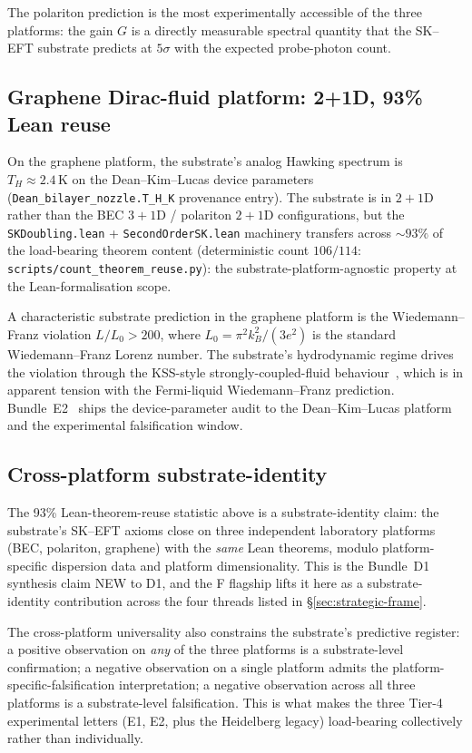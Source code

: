 \documentclass[aps,prd,reprint,nofootinbib,superscriptaddress]{revtex4-2}
\begin{document}
The polariton prediction is the most experimentally accessible of
the three platforms: the gain $G$ is a directly measurable spectral
quantity that the SK--EFT substrate predicts at $5\sigma$ with the
expected probe-photon count.

\subsection{Graphene Dirac-fluid platform: 2+1D, 93\% Lean reuse}

On the graphene platform, the substrate's analog Hawking spectrum is
$T_H \approx 2.4\,\mathrm{K}$ on the Dean--Kim--Lucas device parameters
(\texttt{Dean\_bilayer\_nozzle.T\_H\_K} provenance entry). The substrate is in
$2{+}1$D rather than the BEC $3{+}1$D / polariton $2{+}1$D
configurations, but the \texttt{SKDoubling.lean} +
\texttt{SecondOrderSK.lean} machinery transfers across $\sim 93\%$
of the load-bearing theorem content (deterministic count
$106/114$: \texttt{scripts/count\_theorem\_reuse.py}): the
substrate-platform-agnostic
property at the Lean-formalisation scope.

A characteristic substrate prediction in the graphene platform is the
Wiedemann--Franz violation $L/L_0 > 200$, where $L_0 = \pi^2 k_B^2 /
(3 e^2)$ is the standard Wiedemann--Franz Lorenz number. The
substrate's hydrodynamic regime drives the violation through the
KSS-style strongly-coupled-fluid behaviour~\cite{KSS2005}, which is
in apparent tension with the Fermi-liquid Wiedemann--Franz prediction.
Bundle~E2~\cite{Roehm2026E2} ships the device-parameter audit to the
Dean--Kim--Lucas platform and the experimental falsification window.

\subsection{Cross-platform substrate-identity}

The 93\% Lean-theorem-reuse statistic above is a substrate-identity
claim: the substrate's SK--EFT axioms close on three independent
laboratory platforms (BEC, polariton, graphene) with the \emph{same}
Lean theorems, modulo platform-specific dispersion data and platform
dimensionality. This is the Bundle~D1 synthesis claim NEW to D1, and
the F flagship lifts it here as a substrate-identity contribution
across the four threads listed in \S\ref{sec:strategic-frame}.

The cross-platform universality also constrains the substrate's
predictive register: a positive observation on \emph{any} of the three
platforms is a substrate-level confirmation; a negative observation
on a single platform admits the platform-specific-falsification
interpretation; a negative observation across all three platforms is
a substrate-level falsification. This is what makes the three Tier-4
experimental letters (E1, E2, plus the Heidelberg legacy) load-bearing
collectively rather than individually.
\end{document}
